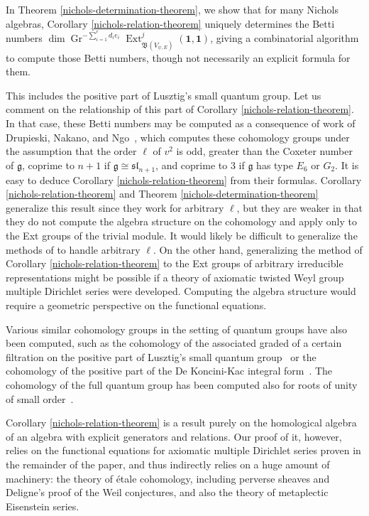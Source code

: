 \documentclass[11pt,letterpaper]{article}
\theoremstyle{definition}
\theoremstyle{remark}
\numberwithin{equation}{section}
\theoremstyle{dotless}
\newcommand{\Gr}{\operatorname{Gr}}
\newcommand{\hchi}{\psi} %
\begin{document}
In Theorem \ref{nichols-determination-theorem}, we show that for many Nichols algebras, Corollary \ref{nichols-relation-theorem} uniquely determines the Betti numbers $\dim \Gr^{ -\sum_{i=1}^r d_i e_i}  \operatorname{Ext}^{j } _{ \mathfrak B( V_{\hchi,E} )} (\mathbf 1, \mathbf 1)$, giving a combinatorial algorithm to compute those Betti numbers, though not necessarily an explicit formula for them.

This includes the positive part of Lusztig's small quantum group. Let us comment on the relationship of this part of Corollary \ref{nichols-relation-theorem}. In that case, these Betti numbers may be computed as a consequence of work of Drupieski, Nakano, and Ngo~\cite[Theorem 5.6.1]{Drupieski2012}, which computes these cohomology groups under the assumption that the order $\ell$ of $v^2$ is odd, greater than the Coxeter number of $\mathfrak g$, coprime to $n+1$ if $\mathfrak g \cong \mathfrak{sl}_{n+1}$, and coprime to $3$ if $\mathfrak g$ has type $E_6$ or $G_2$. It is easy to deduce Corollary \ref{nichols-relation-theorem} from their formulas. Corollary \ref{nichols-relation-theorem} and Theorem \ref{nichols-determination-theorem} generalize this result since they work for arbitrary $\ell$, but they are weaker in that they do not compute the algebra structure on the cohomology and apply only to the Ext groups of the trivial module. It would likely be difficult to generalize the methods of \cite[Theorem 5.6.1]{Drupieski2012} to handle arbitrary $\ell$. On the other hand, generalizing the method of Corollary \ref{nichols-relation-theorem} to the Ext groups of arbitrary irreducible representations might be possible if a theory of axiomatic twisted Weyl group multiple Dirichlet series were developed. Computing the algebra structure would require a geometric perspective on the functional equations.

 Various similar cohomology groups in the setting of quantum groups have also been computed, such as the cohomology of the associated graded of a certain filtration on the positive part of Lusztig's small quantum group~\cite[Proposition 2.3.1]{Ginzburg1993} or the cohomology of the positive part of the De Koncini-Kac integral form~\cite{Vigre2010}. The cohomology of the full quantum group has been computed also for roots of unity of small order~\cite{BKPP}.



Corollary \ref{nichols-relation-theorem} is a result purely on the homological algebra of an algebra with explicit generators and relations. Our proof of it, however, relies on the functional equations for axiomatic multiple Dirichlet series proven in the remainder of the paper, and thus indirectly relies on a huge amount of machinery: the theory of \'{e}tale cohomology, including perverse sheaves and Deligne's proof of the Weil conjectures, and also the theory of metaplectic Eisenstein series.
\end{document}
